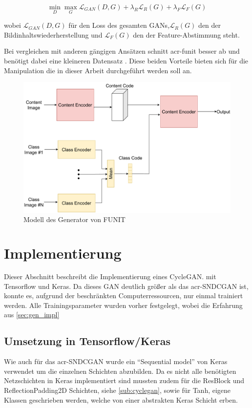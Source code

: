  \[\min_{D} \max_{G} \mathcal{L}_{GAN}(D,G) + \lambda_R \mathcal{L}_R(G) + \lambda_F \mathcal{L}_{F}(G) \]
 
 wobei $ \mathcal{L}_{GAN}(D,G)$ für den Loss des gesamten GANs,$ \mathcal{L}_R(G)$ den der Bildinhaltswiederherstellung und $\mathcal{L}_{F}(G) $ den der Feature-Abstimmung  steht. 
 
 Bei vergleichen mit anderen gängigen Ansätzen schnitt  \gls{acr-funit}  besser ab und benötigt dabei eine kleineren Datensatz \cite{liu_few-shot_2019}. Diese beiden Vorteile bieten sich für die Manipulation die in dieser Arbeit durchgeführt werden soll an.
 
 \begin{figure}[h]
 	\centering
 	\includegraphics[width=0.8\linewidth]{images/Funit_Model_simple}
 	\caption[Modell FUNIT]{Modell des Generator von FUNIT}
 	\label{fig:funitmodelsimple}
 \end{figure}
 
 
 \section{Implementierung} %
 Dieser Abschnitt beschreibt die Implementierung eines CycleGAN. mit Tensorflow und Keras. Da dieses GAN deutlich größer als das \gls{acr-SNDCGAN} ist, konnte es, aufgrund der beschränkten Computerressourcen, nur einmal trainiert werden. Alle Trainingsparameter wurden vorher festgelegt, wobei die Erfahrung aus \cref{sec:gen_impl} 
 
 \subsection{Umsetzung in Tensorflow/Keras}
 Wie auch für das \gls{acr-SNDCGAN} wurde ein \enquote{Sequential model} von Keras~\cite{keras:SequentialModel} verwendet um die einzelnen Schichten abzubilden. Da es nicht alle benötigten Netzschichten in Keras  implementiert sind mussten zudem für die ResBlock und ReflectionPadding2D Schichten, siehe \cref{sub:cyclegan}, sowie für Tanh,  eigene Klassen geschrieben werden, welche von einer abstrakten Keras Schicht erben. 
 
